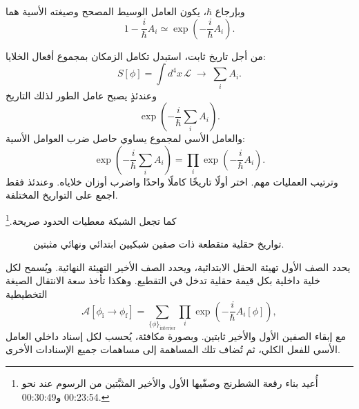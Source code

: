 وبإرجاع \(\hbar\)، يكون العامل الوسيط المصحح وصيغته الأسية هما
\begin{equation}
1-\frac{i}{\hbar}A_i
\simeq
\exp\!\left(-\frac{i}{\hbar}A_i\right).
\end{equation}

من أجل تاريخ ثابت، استبدل تكامل الزمكان بمجموع أفعال الخلايا:
\begin{equation}
S[\phi]
=\int d^4x\,\mathcal{L}
\;\longrightarrow\;
\sum_i A_i.
\end{equation}
وعندئذٍ يصبح عامل الطور لذلك التاريخ
\begin{equation}
\exp\!\left(-\frac{i}{\hbar}\sum_i A_i\right).
\end{equation}
والعامل الأسي لمجموع يساوي حاصل ضرب العوامل الأسية:
\begin{equation}
\exp\!\left(-\frac{i}{\hbar}\sum_i A_i\right)
=
\prod_i\exp\!\left(-\frac{i}{\hbar}A_i\right).
\end{equation}
وترتيب العمليات مهم. اختر أولًا تاريخًا كاملًا واحدًا واضرب أوزان خلاياه. وعندئذ فقط اجمع على التواريخ المختلفة.

كما تجعل الشبكة معطيات الحدود صريحة.\footnote{أُعيد بناء رقعة الشطرنج وصفّيها الأول والأخير المثبَّتين من الرسوم عند نحو 00:23:54 و00:30:49.}
\begin{figure}[htbp]
\centering
{}
\caption{تواريخ حقلية متقطعة ذات صفين شبكيين ابتدائي ونهائي مثبتين.}
\end{figure}

يحدد الصف الأول تهيئة الحقل الابتدائية، ويحدد الصف الأخير التهيئة النهائية. ويُسمح لكل خلية داخلية بكل قيمة حقلية تدخل في التقطيع. وهكذا تأخذ سعة الانتقال الصيغة التخطيطية
\begin{equation}
\mathcal{A}\!\left[\phi_{\mathrm{i}}\rightarrow\phi_{\mathrm{f}}\right]
=
\sum_{\{\phi\}_{\mathrm{interior}}}
\prod_i\exp\!\left(-\frac{i}{\hbar}A_i[\phi]\right),
\end{equation}
مع إبقاء الصفين الأول والأخير ثابتين. وبصورة مكافئة، يُحسب لكل إسناد داخلي العامل الأسي للفعل الكلي، ثم تُضاف تلك المساهمة إلى مساهمات جميع الإسنادات الأخرى.

